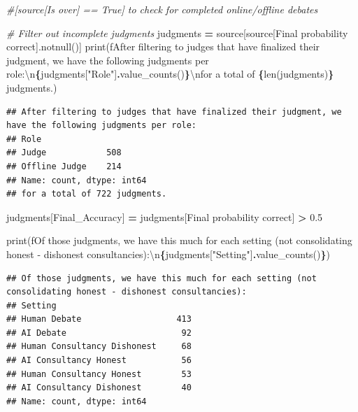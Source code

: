 \documentclass[
]{article}
\newenvironment{Shaded}{\begin{snugshade}}{\end{snugshade}}
\newcommand{\BuiltInTok}[1]{#1}
\newcommand{\CharTok}[1]{\textcolor[rgb]{0.31,0.60,0.02}{#1}}
\newcommand{\CommentTok}[1]{\textcolor[rgb]{0.56,0.35,0.01}{\textit{#1}}}
\newcommand{\FloatTok}[1]{\textcolor[rgb]{0.00,0.00,0.81}{#1}}
\newcommand{\NormalTok}[1]{#1}
\newcommand{\OperatorTok}[1]{\textcolor[rgb]{0.81,0.36,0.00}{\textbf{#1}}}
\newcommand{\SpecialCharTok}[1]{\textcolor[rgb]{0.81,0.36,0.00}{\textbf{#1}}}
\newcommand{\SpecialStringTok}[1]{\textcolor[rgb]{0.31,0.60,0.02}{#1}}
\newcommand{\StringTok}[1]{\textcolor[rgb]{0.31,0.60,0.02}{#1}}
\begin{document}
\begin{Shaded}
\begin{Highlighting}[]
\CommentTok{\#[source[\textquotesingle{}Is over\textquotesingle{}] == True] to check for completed online/offline debates}

\CommentTok{\# Filter out incomplete judgments}
\NormalTok{judgments }\OperatorTok{=}\NormalTok{ source[source[}\StringTok{\textquotesingle{}Final probability correct\textquotesingle{}}\NormalTok{].notnull()]}
\BuiltInTok{print}\NormalTok{(}\SpecialStringTok{f\textquotesingle{}After filtering to judges that have finalized their judgment, we have the following judgments per role:}\CharTok{\textbackslash{}n}\SpecialCharTok{\{}\NormalTok{judgments[}\StringTok{"Role"}\NormalTok{]}\SpecialCharTok{.}\NormalTok{value\_counts()}\SpecialCharTok{\}}\CharTok{\textbackslash{}n}\SpecialStringTok{for a total of }\SpecialCharTok{\{}\BuiltInTok{len}\NormalTok{(judgments)}\SpecialCharTok{\}}\SpecialStringTok{ judgments.\textquotesingle{}}\NormalTok{)}
\end{Highlighting}
\end{Shaded}

\begin{verbatim}
## After filtering to judges that have finalized their judgment, we have the following judgments per role:
## Role
## Judge            508
## Offline Judge    214
## Name: count, dtype: int64
## for a total of 722 judgments.
\end{verbatim}

\begin{Shaded}
\begin{Highlighting}[]
\NormalTok{judgments[}\StringTok{\textquotesingle{}Final\_Accuracy\textquotesingle{}}\NormalTok{] }\OperatorTok{=}\NormalTok{ judgments[}\StringTok{\textquotesingle{}Final probability correct\textquotesingle{}}\NormalTok{] }\OperatorTok{\textgreater{}} \FloatTok{0.5}

\BuiltInTok{print}\NormalTok{(}\SpecialStringTok{f\textquotesingle{}Of those judgments, we have this much for each setting (not consolidating honest {-} dishonest consultancies):}\CharTok{\textbackslash{}n}\SpecialCharTok{\{}\NormalTok{judgments[}\StringTok{"Setting"}\NormalTok{]}\SpecialCharTok{.}\NormalTok{value\_counts()}\SpecialCharTok{\}}\SpecialStringTok{\textquotesingle{}}\NormalTok{)}
\end{Highlighting}
\end{Shaded}

\begin{verbatim}
## Of those judgments, we have this much for each setting (not consolidating honest - dishonest consultancies):
## Setting
## Human Debate                   413
## AI Debate                       92
## Human Consultancy Dishonest     68
## AI Consultancy Honest           56
## Human Consultancy Honest        53
## AI Consultancy Dishonest        40
## Name: count, dtype: int64
\end{verbatim}
\end{document}
